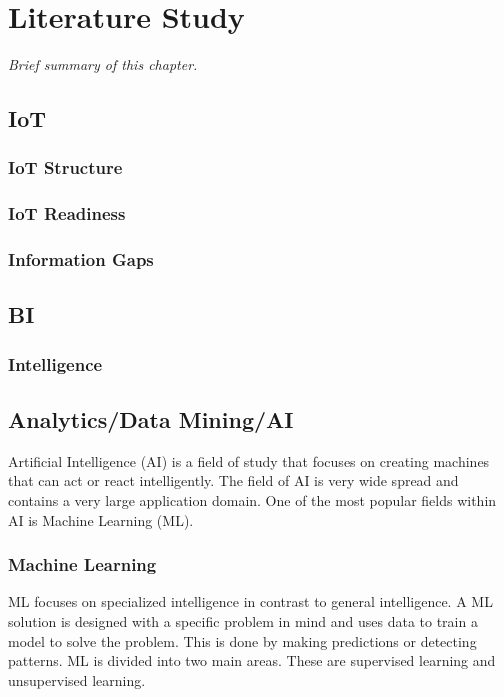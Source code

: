 \chapter{Literature Study}
\emph{
Brief summary of this chapter.
}
\section{IoT}

\subsection{IoT Structure}

\subsection{IoT Readiness}

\subsection{Information Gaps}

\section{BI}

\subsection{Intelligence}

\section{Analytics/Data Mining/AI}
Artificial Intelligence (AI) is a field of study that focuses on creating machines that can act or react intelligently. The field of AI is very wide spread and contains a very large application domain.  One of the most popular fields within AI is Machine Learning (ML). \cite{Joshi2017ArtificialPython}


\subsection{Machine Learning}
ML focuses on specialized intelligence in contrast to general intelligence.  A ML solution is designed with a specific problem in mind and uses data to train a model to solve the problem. This is done by making predictions or detecting patterns. 
ML is divided into two main areas.  These are supervised learning and unsupervised learning.  

